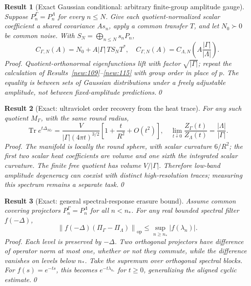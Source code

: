 \documentclass[aps,prd,onecolumn,notitlepage,groupedaddress,11pt]{revtex4-2}
\newtheorem{result}{Result}
\begin{document}
\begin{result}[\textsf{Exact Gaussian conditional}: arbitrary finite-group amplitude gauge]\label{new:142}
Suppose \(P_n^\Gamma=P_n^\Lambda\) for every \(n\le N\). Give each quotient-normalized scalar coefficient a shared covariance \(A s_n\), apply a common transfer \(T\), and let \(N_0\succ0\) be common noise. With \(S_N=\bigoplus_{n\le N}s_n P_n\),
\begin{equation}\label{new:eq142}
C_{\Gamma,N}(A)=N_0+A|\Gamma|\,T S_N T^*,\quad
C_{\Gamma,N}(A)=C_{\Lambda,N}\!\left(A\frac{|\Gamma|}{|\Lambda|}\right).
\end{equation}
\textit{Proof.} Quotient-orthonormal eigenfunctions lift with factor \(\sqrt{|\Gamma|}\); repeat the calculation of Results~\ref{new:109}--\ref{new:115} with group order in place of \(p\). The equality is between \emph{sets of Gaussian distributions under a freely adjustable amplitude}, not between fixed-amplitude predictions.\qed
\end{result}
\begin{result}[\textsf{Exact}: ultraviolet order recovery from the heat trace]\label{new:143}
For any such quotient \(M_\Gamma\), with the same round radius,
\begin{equation}\label{new:eq143}
\operatorname{Tr}e^{t\Delta_{M_\Gamma}}=\frac{V}{|\Gamma|(4\pi t)^{3/2}}
\left[1+\frac{t}{R^2}+O(t^2)\right],\quad
\lim_{t\downarrow0}\frac{Z_\Gamma(t)}{Z_\Lambda(t)}=\frac{|\Lambda|}{|\Gamma|}.
\end{equation}
\textit{Proof.} The manifold is locally the round sphere, with scalar curvature \(6/R^2\); the first two scalar heat coefficients are volume and one sixth the integrated scalar curvature. The finite free quotient has volume \(V/|\Gamma|\). Therefore low-band amplitude degeneracy can coexist with distinct high-resolution traces; measuring this spectrum remains a separate task.\qed
\end{result}
\begin{result}[\textsf{Exact}: general spectral-response erasure bound]\label{new:144}
Assume common covering projectors \(P_n^\Gamma=P_n^\Lambda\) for all \(n<n_*\). For any real bounded spectral filter \(f(-\Delta)\),
\begin{equation}\label{new:eq144}
\left\|f(-\Delta)(\Pi_\Gamma-\Pi_\Lambda)\right\|_{\mathrm{op}}
\le\sup_{n\ge n_*}|f(\lambda_n)|.
\end{equation}
\textit{Proof.} Each level is preserved by \(-\Delta\). Two orthogonal projectors have difference of operator norm at most one, whether or not they commute, while the difference vanishes on levels below \(n_*\). Take the supremum over orthogonal spectral blocks. For \(f(s)=e^{-ts}\), this becomes \(e^{-t\lambda_{n_*}}\) for \(t\ge0\), generalizing the aligned cyclic estimate.\qed
\end{result}
\end{document}
